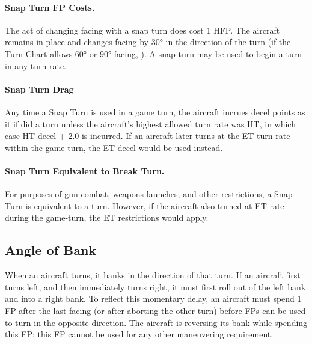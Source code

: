 {\paragraph{Snap Turn FP Costs.} The act of changing facing with a snap turn does cost 1 HFP.  The aircraft remains in place and changes facing by 30° in the direction of the turn (if the Turn Chart allows 60° or 90° facing, ). A snap turn may be used to begin a turn in any turn rate.

\paragraph{Snap Turn Drag} Any time a Snap Turn is used in a game turn, the aircraft incrues decel points as it if did a  turn unless the aircraft's highest allowed turn rate was HT, in which case HT decel + 2.0 is incurred. If an aircraft later turns at the ET turn rate within the game turn, the ET decel would be used instead.

\paragraph{Snap Turn Equivalent to Break Turn.} For purposes of gun combat, weapons launches, and other restrictions, a Snap Turn is equivalent to a  turn. However, if the aircraft also turned at ET rate during the game-turn, the ET restrictions would apply.
}

\subsection{Angle of Bank}

When an aircraft turns, it banks in the direction of that turn.  If an aircraft first turns left, and then immediately turns right, it must first roll out of the left bank and into a right bank. To reflect this momentary delay, an aircraft must spend 1 FP after the last facing (or after aborting the other turn) before FPs can be used to turn in the opposite direction. The aircraft is reversing its bank while spending this FP; this FP cannot be used for any other maneuvering requirement.


